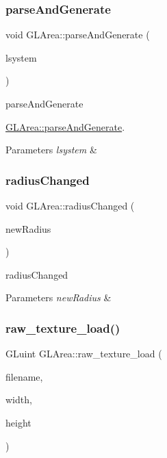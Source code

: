 \subsubsection{\texorpdfstring{parse\+And\+Generate}{parseAndGenerate}}
{\footnotesize\ttfamily void G\+L\+Area\+::parse\+And\+Generate (\begin{DoxyParamCaption}\item[{\hyperlink{classLSystem}{L\+System} $\ast$}]{lsystem }\end{DoxyParamCaption})\hspace{0.3cm}{\ttfamily [slot]}}



parse\+And\+Generate 

\hyperlink{classGLArea_a9a09b4b0282edd1ab833ae7b676260de}{G\+L\+Area\+::parse\+And\+Generate}.


\begin{DoxyParams}{Parameters}
{\em lsystem} & \\
\hline
\end{DoxyParams}
\mbox{\label{classGLArea_a814e5294e79165efc0878718c72db9f6}} 
\subsubsection{\texorpdfstring{radius\+Changed}{radiusChanged}}
{\footnotesize\ttfamily void G\+L\+Area\+::radius\+Changed (\begin{DoxyParamCaption}\item[{double}]{new\+Radius }\end{DoxyParamCaption})\hspace{0.3cm}{\ttfamily [signal]}}



radius\+Changed 


\begin{DoxyParams}{Parameters}
{\em new\+Radius} & \\
\hline
\end{DoxyParams}
\mbox{\label{classGLArea_ac4f7a48d46be9e7c6e63b16b5c3c6441}} 
\subsubsection{\texorpdfstring{raw\+\_\+texture\+\_\+load()}{raw\_texture\_load()}}
{\footnotesize\ttfamily G\+Luint G\+L\+Area\+::raw\+\_\+texture\+\_\+load (\begin{DoxyParamCaption}\item[{const char $\ast$}]{filename,  }\item[{int}]{width,  }\item[{int}]{height }\end{DoxyParamCaption})}



